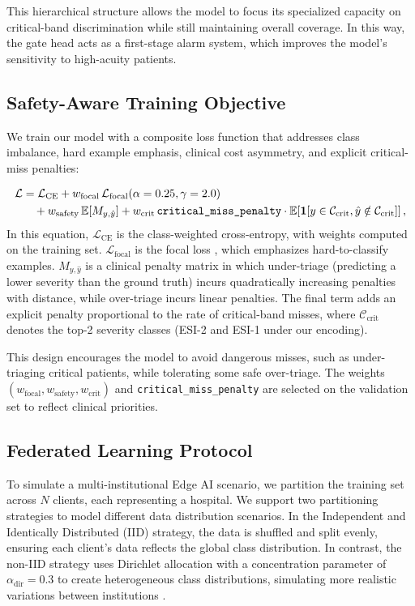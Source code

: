 \documentclass[journal,article,submit,pdftex,moreauthors]{Definitions/mdpi}
\begin{document}
This hierarchical structure allows the model to focus its specialized capacity on critical-band discrimination while still maintaining overall coverage. In this way, the gate head acts as a first-stage alarm system, which improves the model's sensitivity to high-acuity patients.

\subsection{Safety-Aware Training Objective}\label{sec:loss}

We train our model with a composite loss function that addresses class imbalance, hard example emphasis, clinical cost asymmetry, and explicit critical-miss penalties:

\begin{align}
\mathcal{L} &= \mathcal{L}_{\text{CE}} + w_{\text{focal}}\,\mathcal{L}_{\text{focal}}(\alpha=0.25, \gamma=2.0) \notag \\
&\quad + w_{\text{safety}}\,\mathbb{E}[M_{y,\hat{y}}] + w_{\text{crit}}\,\texttt{critical\_miss\_penalty}\cdot \mathbb{E}\!\left[\mathbf{1}[y \in \mathcal{C}_{\text{crit}}, \hat{y}\notin \mathcal{C}_{\text{crit}}]\right],
\end{align}
In this equation, $\mathcal{L}_{\text{CE}}$ is the class-weighted cross-entropy, with weights computed on the training set. $\mathcal{L}_{\text{focal}}$ is the focal loss \cite{lin2017}, which emphasizes hard-to-classify examples. $M_{y,\hat{y}}$ is a clinical penalty matrix in which under-triage (predicting a lower severity than the ground truth) incurs quadratically increasing penalties with distance, while over-triage incurs linear penalties. The final term adds an explicit penalty proportional to the rate of critical-band misses, where $\mathcal{C}_{\text{crit}}$ denotes the top-2 severity classes (ESI-2 and ESI-1 under our encoding).

This design encourages the model to avoid dangerous misses, such as under-triaging critical patients, while tolerating some safe over-triage. The weights $(w_{\text{focal}}, w_{\text{safety}}, w_{\text{crit}})$ and \texttt{critical\_miss\_penalty} are selected on the validation set to reflect clinical priorities.

\subsection{Federated Learning Protocol}\label{sec:federated}

To simulate a multi-institutional Edge AI scenario, we partition the training set across $N$ clients, each representing a hospital. We support two partitioning strategies to model different data distribution scenarios. In the Independent and Identically Distributed (IID) strategy, the data is shuffled and split evenly, ensuring each client's data reflects the global class distribution. In contrast, the non-IID strategy uses Dirichlet allocation with a concentration parameter of $\alpha_{\text{dir}}=0.3$ to create heterogeneous class distributions, simulating more realistic variations between institutions \cite{hsu2019measuring}.
\end{document}
